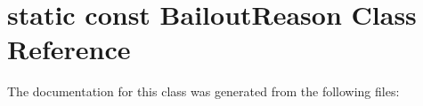 \hypertarget{classstatic_01const_01BailoutReason}{}\section{static const Bailout\+Reason Class Reference}
\label{classstatic_01const_01BailoutReason}


The documentation for this class was generated from the following files\+: